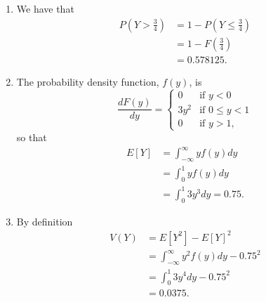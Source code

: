 \documentclass[9pt]{article}
\begin{document}
\begin{enumerate}
      \begin{enumerate}
         \item We have that
               \begin{align*}
                  P\left(Y > \frac{3}{4}\right) &=
                     1 - P\left(Y \le \frac{3}{4}\right) \\
                     &= 1 - F\left(\frac{3}{4}\right) \\
                     &= 0.578125.
               \end{align*}
         \item The probability density function, $f(y)$, is
               \begin{equation*}
                  \frac{dF(y)}{dy} = \begin{cases}
                     0   & \text{if } y < 0 \\
                     3y^2 & \text{if } 0 \le y < 1 \\
                     0   & \text{if } y > 1,
                  \end{cases}
               \end{equation*}
               so that
               \begin{align*}
                  E[Y] &= \int_{-\infty}^{\infty} y f(y) dy \\
                     &= \int_0^1 y f(y) dy \\
                     &= \int_0^1 3y^3 dy = 0.75.
               \end{align*}
         \item By definition
               \begin{align*}
                  V(Y) &= E[Y^2] - E[Y]^2 \\
                     &= \int_{-\infty}^{\infty} y^2f(y) dy - 0.75^2 \\
                     &= \int_0^1 3y^4 dy - 0.75^2 \\
                     &= 0.0375.
               \end{align*}
               
      \end{enumerate}
\end{enumerate}
\end{document}
